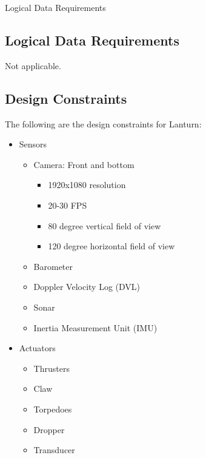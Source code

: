 Logical Data Requirements
\subsection{Logical Data Requirements}
\label{sec:logical}

Not applicable.
\par

\subsection{Design Constraints}
\label{sec:constraints}

The following are the design constraints for Lanturn:
\begin{itemize}
    \item Sensors
        \begin{itemize}
            \item Camera: Front and bottom
                \begin{itemize}
                    \item 1920x1080 resolution 
                    \item 20-30 FPS
                    \item 80 degree vertical field of view
                    \item 120 degree horizontal field of view
                \end{itemize}
            \item Barometer
            \item Doppler Velocity Log (DVL)
            \item Sonar
            \item Inertia Measurement Unit (IMU)
        \end{itemize}
    \item Actuators
        \begin{itemize}
            \item Thrusters
            \item Claw
            \item Torpedoes
            \item Dropper
            \item Transducer
        \end{itemize}
\end{itemize}

